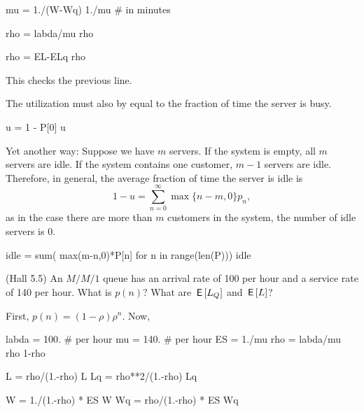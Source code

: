 \begin{exercise}
\begin{solution}
\begin{pyconsole}
mu = 1./(W-Wq)
1./mu # in minutes

rho = labda/mu
rho
\end{pyconsole}

\begin{pyconsole}
rho = EL-ELq
rho
\end{pyconsole}
This checks the previous line.

The utilization must also by equal to the fraction of time the server is busy. 
\begin{pyconsole}
u = 1 - P[0]
u
\end{pyconsole}

Yet another way: Suppose we have $m$ servers. If the system is empty,
all $m$ servers are idle. If the system contains one customer, $m-1$
servers are idle. Therefore, in general, the average fraction of time
the server is idle is
\begin{equation*}
1- u = \sum_{n=0}^\infty \max\{n-m, 0\}  p_n,
\end{equation*}
as in the case there are more than $m$ customers in the system, the
number of idle servers is $0$.


\begin{pyconsole}
idle = sum( max(m-n,0)*P[n] for n in range(len(P)))
idle
\end{pyconsole}

   \end{solution}
 
\end{exercise}

\begin{exercise}
  (Hall 5.5) An $M/M/1$ queue has an arrival rate of 100 per hour and
  a service rate of 140 per hour.
 What is $p(n)$?  What are $\,\mathsf{E}\left[L_Q\right]$ and $\,\mathsf{E}\left[L\right]$?
\begin{solution}
First, $p(n) = (1-\rho)\rho^n$. Now,

\begin{pyconsole}
labda = 100. # per hour
mu = 140. # per hour
ES = 1./mu
rho = labda/mu
rho 
1-rho

L = rho/(1.-rho)
L
Lq = rho**2/(1.-rho)
Lq

W = 1./(1.-rho) * ES
W
Wq = rho/(1.-rho) * ES
Wq
\end{pyconsole}

  \end{solution}
\end{exercise}

